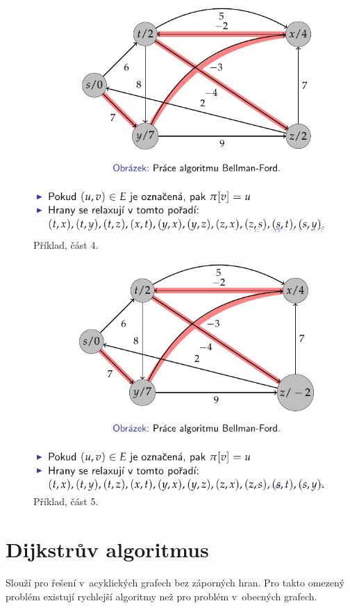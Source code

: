 \begin{figure}[H]
    \centering
    \includegraphics[width=0.75\linewidth]{example_bellman_ford_p4.pdf}
    \caption{Příklad, část 4.}
\end{figure}

\begin{figure}[H]
    \centering
    \includegraphics[width=0.75\linewidth]{example_bellman_ford_p5.pdf}
    \caption{Příklad, část 5.}
\end{figure}


\section{Dijkstrův algoritmus}

Slouží pro řešení v~acyklických grafech bez záporných hran. Pro takto omezený problém existují rychlejší algoritmy než pro problém v~obecných grafech.

